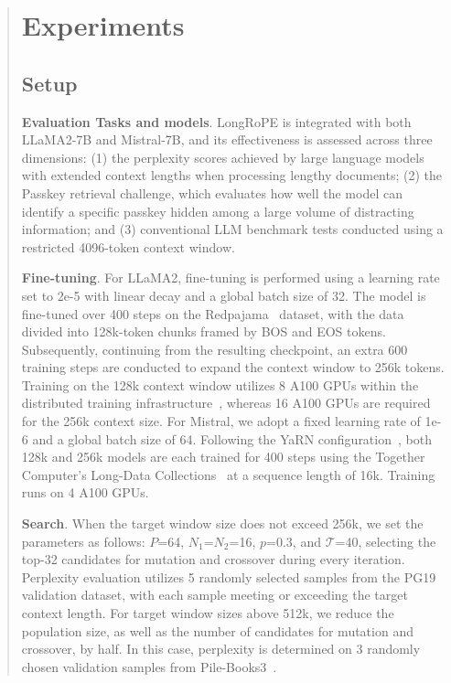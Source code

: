\begin{abstract}
 \section{Experiments}

\label{sec:exp}
\subsection{Setup}
\textbf{Evaluation Tasks and models}. LongRoPE is integrated with both LLaMA2-7B and Mistral-7B, and its effectiveness is assessed across three dimensions: (1) the perplexity scores achieved by large language models with extended context lengths when processing lengthy documents; (2) the Passkey retrieval challenge, which evaluates how well the model can identify a specific passkey hidden among a large volume of distracting information; and (3) conventional LLM benchmark tests conducted using a restricted 4096-token context window.

\textbf{Fine-tuning}. For LLaMA2, fine-tuning is performed using a learning rate set to 2e-5 with linear decay and a global batch size of 32. The model is fine-tuned over 400 steps on the Redpajama~\cite{redpajama} dataset, with the data divided into 128k-token chunks framed by BOS and EOS tokens. Subsequently, continuing from the resulting checkpoint, an extra 600 training steps are conducted to expand the context window to 256k tokens. Training on the 128k context window utilizes 8 A100 GPUs within the distributed training infrastructure~\cite{cube}, whereas 16 A100 GPUs are required for the 256k context size. For Mistral, we adopt a fixed learning rate of 1e-6 and a global batch size of 64. Following the YaRN configuration~\cite{yarn}, both 128k and 256k models are each trained for 400 steps using the Together Computer's Long-Data Collections~\cite{mistraldata} at a sequence length of 16k. Training runs on 4 A100 GPUs.

\textbf{Search}. When the target window size does not exceed 256k, we set the parameters as follows: $P$=64, $N_1$=$N_2$=16, $p$=0.3, and $\mathcal{T}$=40, selecting the top-32 candidates for mutation and crossover during every iteration. Perplexity evaluation utilizes 5 randomly selected samples from the PG19 validation dataset, with each sample meeting or exceeding the target context length. For target window sizes above 512k, we reduce the population size, as well as the number of candidates for mutation and crossover, by half. In this case, perplexity is determined on 3 randomly chosen validation samples from Pile-Books3~\cite{pile}.


\end{abstract}
